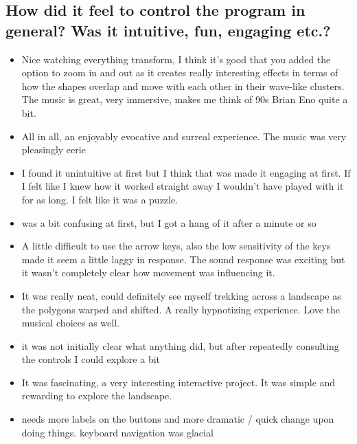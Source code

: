 \subsection{How did it feel to control the program in general? Was it intuitive, fun, engaging etc.?}
\begin{itemize}
    \item Nice watching everything transform, I think it's good that you added the option
        to zoom in and out as it creates really interesting effects in terms of how the
        shapes overlap and move with each other in their wave-like clusters. The music
        is great, very immersive, makes me think of 90s Brian Eno quite a bit.

    \item All in all, an enjoyably evocative and surreal experience. The music was very
        pleasingly eerie

    \item I found it unintuitive at first but I think that was made it engaging at first.
        If I felt like I knew how it worked straight away I wouldn't have played with it
        for as long. I felt like it was a puzzle. 

    \item was a bit confusing at first, but I got a hang of it after a minute or so

    \item A little difficult to use the arrow keys, also the low sensitivity of the keys
        made it seem a little laggy in response. The sound response was exciting but it
        wasn't completely clear how movement was influencing it. 

    \item It was really neat, could definitely see myself trekking across a landscape as
        the polygons warped and shifted. A really hypnotizing experience. Love the
        musical choices as well.

    \item it was not initially clear what anything did, but after repeatedly consulting
        the controls I could explore a bit

    \item It was fascinating, a very interesting interactive project. It was simple and
        rewarding to explore the landscape.

    \item needs more labels on the buttons and more dramatic / quick change upon doing
        things. keyboard navigation was glacial


\end{itemize}
